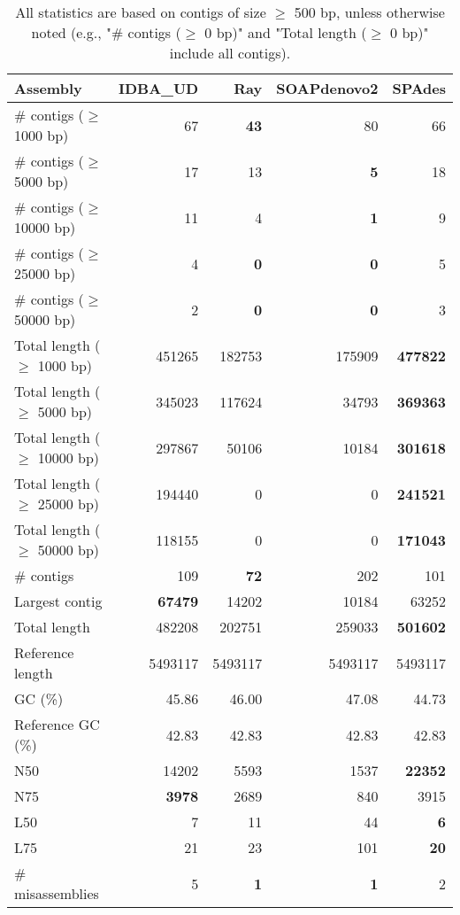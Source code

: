 \documentclass[12pt,a4paper]{article}
\begin{document}
\begin{table}[ht]
\begin{center}
\caption{All statistics are based on contigs of size $\geq$ 500 bp, unless otherwise noted (e.g., "\# contigs ($\geq$ 0 bp)" and "Total length ($\geq$ 0 bp)" include all contigs).}
\begin{tabular}{|l*{4}{|r}|}
\hline
Assembly & IDBA\_UD & Ray & SOAPdenovo2 & SPAdes \\ \hline
\# contigs ($\geq$ 1000 bp) & 67 & {\bf 43} & 80 & 66 \\ \hline
\# contigs ($\geq$ 5000 bp) & 17 & 13 & {\bf 5} & 18 \\ \hline
\# contigs ($\geq$ 10000 bp) & 11 & 4 & {\bf 1} & 9 \\ \hline
\# contigs ($\geq$ 25000 bp) & 4 & {\bf 0} & {\bf 0} & 5 \\ \hline
\# contigs ($\geq$ 50000 bp) & 2 & {\bf 0} & {\bf 0} & 3 \\ \hline
Total length ($\geq$ 1000 bp) & 451265 & 182753 & 175909 & {\bf 477822} \\ \hline
Total length ($\geq$ 5000 bp) & 345023 & 117624 & 34793 & {\bf 369363} \\ \hline
Total length ($\geq$ 10000 bp) & 297867 & 50106 & 10184 & {\bf 301618} \\ \hline
Total length ($\geq$ 25000 bp) & 194440 & 0 & 0 & {\bf 241521} \\ \hline
Total length ($\geq$ 50000 bp) & 118155 & 0 & 0 & {\bf 171043} \\ \hline
\# contigs & 109 & {\bf 72} & 202 & 101 \\ \hline
Largest contig & {\bf 67479} & 14202 & 10184 & 63252 \\ \hline
Total length & 482208 & 202751 & 259033 & {\bf 501602} \\ \hline
Reference length & 5493117 & 5493117 & 5493117 & 5493117 \\ \hline
GC (\%) & 45.86 & 46.00 & 47.08 & 44.73 \\ \hline
Reference GC (\%) & 42.83 & 42.83 & 42.83 & 42.83 \\ \hline
N50 & 14202 & 5593 & 1537 & {\bf 22352} \\ \hline
N75 & {\bf 3978} & 2689 & 840 & 3915 \\ \hline
L50 & 7 & 11 & 44 & {\bf 6} \\ \hline
L75 & 21 & 23 & 101 & {\bf 20} \\ \hline
\# misassemblies & 5 & {\bf 1} & {\bf 1} & 2 \\ \hline

\end{tabular}
\end{center}
\end{table}
\end{document}
